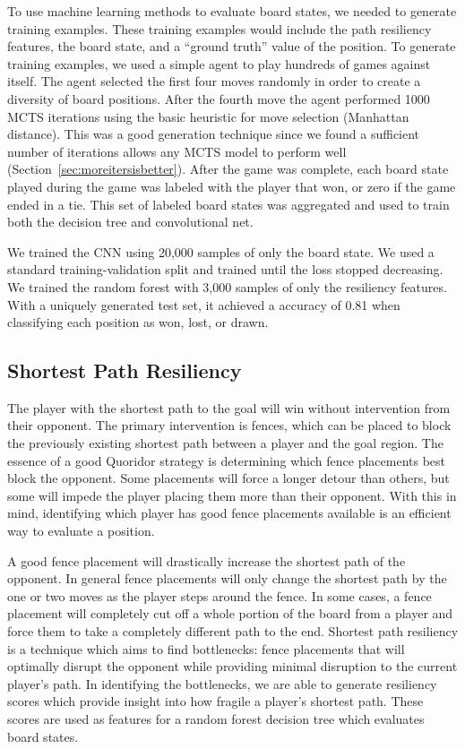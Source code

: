 \documentclass[10pt]{article}
\begin{document}
To use machine learning methods to evaluate board states, we needed to  generate training examples. These training examples would include the path resiliency features, the board state, and a ``ground truth'' value of the position. To generate training examples, we used a simple agent to play hundreds of games against itself. The agent selected the first four moves randomly in order to create a diversity of board positions. After the fourth move the agent performed 1000 MCTS iterations using the basic heuristic for move selection (Manhattan distance). This was a good generation technique since we found a sufficient number of iterations allows any MCTS model to perform well (Section~\ref{sec:moreitersisbetter}). After the game was complete, each board state played during the game was labeled with the player that won, or zero if the game ended in a tie. This set of labeled board states was aggregated and used to train both the decision tree and convolutional net.

We trained the CNN using 20,000 samples of only the board state. We used a standard training-validation split and trained until the loss stopped decreasing. We trained the random forest with 3,000 samples of only the resiliency features. With a uniquely generated test set, it achieved a accuracy of 0.81 when classifying each position as won, lost, or drawn.


\subsection{Shortest Path Resiliency}

The player with the shortest path to the goal will win without intervention from their opponent. The primary intervention is fences, which can be placed to block the previously existing shortest path between a player and the goal region. The essence of a good Quoridor strategy is determining which fence placements best block the opponent. Some placements will force a longer detour than others, but some will impede the player placing them more than their opponent. With this in mind, identifying which player has good fence placements available is an efficient way to evaluate a position.  

A good fence placement will drastically increase the shortest path of the opponent. In general fence placements will only change the shortest path by the one or two moves as the player steps around the fence. In some cases, a fence placement will completely cut off a whole portion of the board from a player and force them to take a completely different path to the end. Shortest path resiliency is a technique which aims to find bottlenecks: fence placements that will optimally disrupt the opponent while providing minimal disruption to the current player's path. In identifying the bottlenecks, we are able to generate resiliency scores which provide insight into how fragile a player's shortest path. These scores are used as features for a random forest decision tree which evaluates board states.
\end{document}
